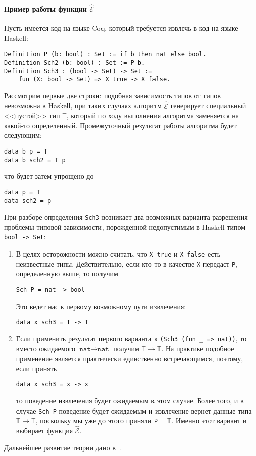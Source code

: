 \paragraph{Пример работы функции $\hat{\mathcal{E}}$}
Пусть имеется код на языке Coq, который требуется извлечь в код на языке Haskell:
\begin{Verbatim}[fontsize=\small]
Definition P (b: bool) : Set := if b then nat else bool.
Definition Sch2 (b: bool) : Set := P b.
Definition Sch3 : (bool -> Set) -> Set :=
	fun (X: bool -> Set) => X true -> X false.
\end{Verbatim}

Рассмотрим первые две строки: подобная зависимость типов от типов невозможна в Haskell, при таких случаях алгоритм $\hat{\mathcal{E}}$ генерирует специальный <<пустой>> тип $\mathbb{T}$, который по ходу выполнения алгоритма заменяется на какой-то определенный. Промежуточный результат работы алгоритма будет следующим:
\begin{Verbatim}[fontsize=\small]
data b p = T
data b sch2 = T p
\end{Verbatim}
что будет затем упрощено до
\begin{Verbatim}[fontsize=\small]
data p = T
data sch2 = p
\end{Verbatim}

При разборе определения \texttt{Sch3} возникает два возможных варианта разрешения проблемы типовой зависимости, порожденной недопустимым в Haskell типом \texttt{bool -> Set}:
\begin{enumerate}
\item В целях осторожности можно считать, что \texttt{X true} и \texttt{X false} есть неизвестные типы. Действительно, если кто-то в качестве \texttt{X} передаст \texttt{P}, определенную выше, то получим
\begin{Verbatim}[fontsize=\small]
Sch P = nat -> bool
\end{Verbatim} 
Это ведет нас к первому возможному пути извлечения:
\begin{Verbatim}[fontsize=\small]
data x sch3 = T -> T
\end{Verbatim}
\item  Если применить результат первого варианта к \texttt{(Sch3 (fun \_ => nat))}, то вместо ожидаемого $\texttt{nat} \rightarrow \texttt{nat}$ получим $\mathbb{T} \rightarrow \mathbb{T}$. На практике подобное применение является практически единственно встречающимся, поэтому, если принять
\begin{Verbatim}[fontsize=\small]
data x sch3 = x -> x
\end{Verbatim}
то поведение извлечения будет ожидаемым в этом случае. Более того, и в случае \texttt{Sch P} поведение будет ожидаемым и извлечение вернет данные типа $\mathbb{T} \rightarrow \mathbb{T}$, поскольку мы уже до этого приняли $\texttt{P} = \mathbb{T}$. Именно этот вариант и выбирает функция $\hat{\mathcal{E}}$.
\end{enumerate}
Дальнейшее развитие теории дано в~\autocite{Pierre2004}.

